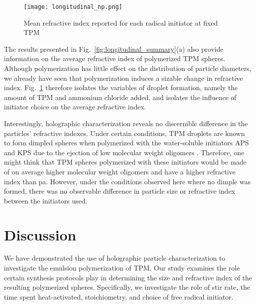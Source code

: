 \begin{figure}
    \centering
    \texttt{[image: longitudinal\_np.png]}
    \caption{Mean refractive index reported for each radical initiator
    at fixed TPM}
    \label{fig:longitudinal_np}
\end{figure}

The results presented in Fig.~\ref{fig:longitudinal_summary}(a) also provide information
on the average refractive index of polymerized TPM spheres. Although polymerization
has little effect on the distribution of particle diameters, we already have seen that
polymerization induces a sizable change in refractive index. Fig.~\ref{fig:longitudinal_np} therefore isolates the
variables of droplet formation, namely the amount of TPM and ammonium chloride added,
and isolates the influence of initiator choice on the average refractive index.


Interestingly, holographic characterization reveals no discernible difference
in the particles' refractive indexes.
Under certain conditions, TPM droplets are known to form dimpled spheres when polymerized
with the water-soluble initiators APS and KPS due to the ejection of low molecular weight
oligomers \cite{sacanna11}.
Therefore, one might think that TPM spheres polymerized with these initiators would be
made of on average higher molecular weight oligomers and have a higher refractive index
than pa. However, under the conditions observed here where no dimple was formed, there
was no observable difference in particle size or refractive index between the initiators
used.

\section{Discussion}

We have demonstrated the use of holographic particle characterization
to investigate the emulsion polymerization of TPM. Our study examines the
role certain synthesis protocols play in determining the
size and refractive index of the resulting polymerized spheres. Specifically,
we investigate the role of stir rate, the time spent heat-activated, stoichiometry, and choice of
free radical initiator.

